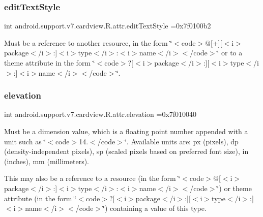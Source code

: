 \subsubsection{\texorpdfstring{edit\+Text\+Style}{editTextStyle}}
{\footnotesize\ttfamily int android.\+support.\+v7.\+cardview.\+R.\+attr.\+edit\+Text\+Style =0x7f0100b2\hspace{0.3cm}{\ttfamily [static]}}

Must be a reference to another resource, in the form \char`\"{}$<$code$>$@\mbox{[}+\mbox{]}\mbox{[}$<$i$>$package$<$/i$>$\+:\mbox{]}$<$i$>$type$<$/i$>$\+:$<$i$>$name$<$/i$>$$<$/code$>$\char`\"{} or to a theme attribute in the form \char`\"{}$<$code$>$?\mbox{[}$<$i$>$package$<$/i$>$\+:\mbox{]}\mbox{[}$<$i$>$type$<$/i$>$\+:\mbox{]}$<$i$>$name$<$/i$>$$<$/code$>$\char`\"{}. \mbox{\label{classandroid_1_1support_1_1v7_1_1cardview_1_1R_1_1attr_af8da2ee4ea221f8d413747edbfbf8ccb}} 
\subsubsection{\texorpdfstring{elevation}{elevation}}
{\footnotesize\ttfamily int android.\+support.\+v7.\+cardview.\+R.\+attr.\+elevation =0x7f010040\hspace{0.3cm}{\ttfamily [static]}}

Must be a dimension value, which is a floating point number appended with a unit such as \char`\"{}$<$code$>$14.\+5sp$<$/code$>$\char`\"{}. Available units are\+: px (pixels), dp (density-\/independent pixels), sp (scaled pixels based on preferred font size), in (inches), mm (millimeters). 

This may also be a reference to a resource (in the form \char`\"{}$<$code$>$@\mbox{[}$<$i$>$package$<$/i$>$\+:\mbox{]}$<$i$>$type$<$/i$>$\+:$<$i$>$name$<$/i$>$$<$/code$>$\char`\"{}) or theme attribute (in the form \char`\"{}$<$code$>$?\mbox{[}$<$i$>$package$<$/i$>$\+:\mbox{]}\mbox{[}$<$i$>$type$<$/i$>$\+:\mbox{]}$<$i$>$name$<$/i$>$$<$/code$>$\char`\"{}) containing a value of this type. \mbox{\label{classandroid_1_1support_1_1v7_1_1cardview_1_1R_1_1attr_a5cf4a86d1951bf7c1f69873d84ffdc45}} 
